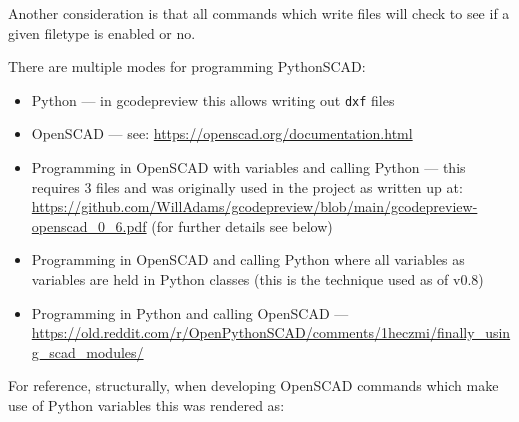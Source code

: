 \documentclass{ltxdoc}
\begin{document}

\addvspace{\baselineskip}


Another consideration is that all commands which write files will check to see if a given filetype is enabled or no.

There are multiple modes for programming PythonSCAD:

\begin{itemize}
\item Python --- in gcodepreview this allows writing out \verb|dxf| files
\item OpenSCAD --- see: \url{https://openscad.org/documentation.html}
\item Programming in OpenSCAD with variables and calling Python --- this requires 3 files and was originally used in the project as written up at: \url{https://github.com/WillAdams/gcodepreview/blob/main/gcodepreview-openscad_0_6.pdf} (for further details see below)
\item Programming in OpenSCAD and calling Python where all variables as variables are held in Python classes (this is the technique used as of v0.8)
\item Programming in Python and calling OpenSCAD --- \url{https://old.reddit.com/r/OpenPythonSCAD/comments/1heczmi/finally_using_scad_modules/}
\end{itemize}

For reference, structurally, when developing OpenSCAD commands which make use of Python variables this was rendered as:
\end{document}
